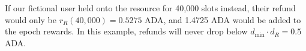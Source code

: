 \documentclass[11pt,a4paper]{article}
\begin{document}
If our fictional user held onto the resource for 40,000 slots instead,
their refund would only be $r_R(40,000)=0.5275$ ADA, and 1.4725 ADA
would be added to the epoch rewards. In this example, refunds will
never drop below $d_{\min}\cdot d_R=0.5$ ADA.




\end{document}
